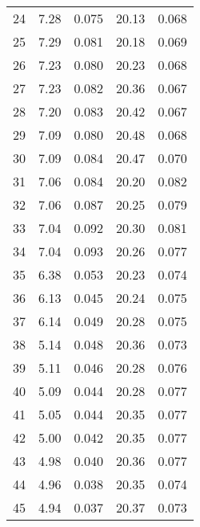 \begin{table}
\begin{tabular}{c|ll|ll}
24 & 7.28 & 0.075 & 20.13 & 0.068 \\
25 & 7.29 & 0.081 & 20.18 & 0.069 \\
26 & 7.23 & 0.080 & 20.23 & 0.068 \\
27 & 7.23 & 0.082 & 20.36 & 0.067 \\
28 & 7.20 & 0.083 & 20.42 & 0.067 \\
29 & 7.09 & 0.080 & 20.48 & 0.068 \\
30 & 7.09 & 0.084 & 20.47 & 0.070 \\
31 & 7.06 & 0.084 & 20.20 & 0.082 \\
32 & 7.06 & 0.087 & 20.25 & 0.079 \\
33 & 7.04 & 0.092 & 20.30 & 0.081 \\
34 & 7.04 & 0.093 & 20.26 & 0.077 \\
35 & 6.38 & 0.053 & 20.23 & 0.074 \\
36 & 6.13 & 0.045 & 20.24 & 0.075 \\
37 & 6.14 & 0.049 & 20.28 & 0.075 \\
38 & 5.14 & 0.048 & 20.36 & 0.073 \\
39 & 5.11 & 0.046 & 20.28 & 0.076 \\
40 & 5.09 & 0.044 & 20.28 & 0.077 \\
41 & 5.05 & 0.044 & 20.35 & 0.077 \\
42 & 5.00 & 0.042 & 20.35 & 0.077 \\
43 & 4.98 & 0.040 & 20.36 & 0.077 \\
44 & 4.96 & 0.038 & 20.35 & 0.074 \\
45 & 4.94 & 0.037 & 20.37 & 0.073 \\
               \hline
        \end{tabular}
    \end{table}
    \clearpage

